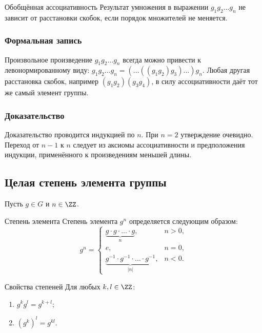\begin{Proposition}{Обобщённая ассоциативность}{}
	Результат умножения в выражении $g_1g_2\dots g_n$
	не зависит от расстановки скобок, если порядок множителей не меняется.
\end{Proposition}

\subsubsection*{Формальная запись}

Произвольное произведение $g_1g_2\dots g_n$ всегда можно привести к левонормированному виду: $g_1g_2\dots g_n = (\dots((g_1g_2)g_3)\dots)g_n.$
Любая другая расстановка скобок, например $(g_1g_2)(g_3g_4)$, в силу ассоциативности даёт тот же самый элемент группы.

\subsubsection*{Доказательство}

Доказательство проводится индукцией по $n$. При $n=2$ утверждение очевидно. Переход от $n-1$ к $n$ следует из аксиомы ассоциативности и предположения индукции, применённого к произведениям меньшей длины.

\subsection{Целая степень элемента группы}

Пусть $g \in G$ и $n \in \ZZ$.

\begin{Definition}{Степень элемента}{}
	Степень элемента $g^n$ определяется следующим образом:
	\[
	g^n =
	\begin{cases}
		\underbrace{g \cdot g \cdot \dots \cdot g}_{n}, & n > 0, \\
		e, & n = 0, \\
		\underbrace{g^{-1} \cdot g^{-1} \cdot \dots \cdot g^{-1}}_{|n|}, & n < 0.
	\end{cases}
	\]
\end{Definition}

\begin{Proposition}{Свойства степеней}{}
	Для любых $k,l \in \ZZ$:
	\begin{enumerate}
		\item $g^k g^l = g^{k+l}$;
		\item $(g^k)^l = g^{kl}$.
	\end{enumerate}
\end{Proposition}

